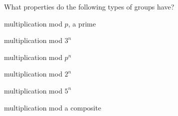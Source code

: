 \documentclass[../gatm_answers.tex]{subfiles}
\begin{document}
\begin{outer_problem}
\item What properties do the following types of groups have?
\end{outer_problem}

\begin{inner_problem}[start=1]
\item multiplication mod $p$, a prime
\end{inner_problem}

\begin{inner_problem}
\item multiplication mod $3^n$
\end{inner_problem}

\begin{inner_problem}
\item multiplication mod $p^n$
\end{inner_problem}

\begin{inner_problem}
\item multiplication mod $2^n$
\end{inner_problem}

\begin{inner_problem}
\item multiplication mod $5^n$
\end{inner_problem}

\begin{inner_problem}
\item multiplication mod a composite
\end{inner_problem}
\end{document}
